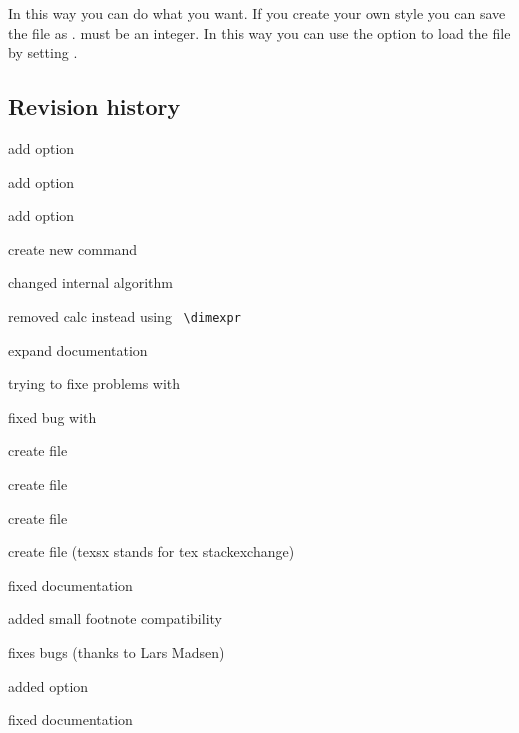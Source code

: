 \documentclass[parskip=false,english,11pt]{ltxmdf}
\begin{document}
In this way you can do what you want. If you create your own style you
can save the file as .
 must be an integer. 
In this way you can use the option  to
load the file by setting .

\clearpage



\subsection{Revision history}\label{rev}
\raggedright
{}
\begin{itemize*}
\item add option 
\item add option 
\item add option 
\item create new command 
\item changed internal algorithm
\item removed calc instead using \eTeX\ \verb+\dimexpr+
\item expand documentation
\item trying to fixe problems with 
\item fixed bug with 
\item create file 
\item create file 
\item create file 
\item create file  (texsx stands for tex stackexchange)
\end{itemize*}


\footnotesize
{}
\begin{itemize*}
\item fixed documentation
\item added small footnote compatibility
\end{itemize*}

\begin{itemize*}
\item fixes bugs (thanks to Lars Madsen)
\item added option 
\item fixed documentation
\end{itemize*}
\end{document}
